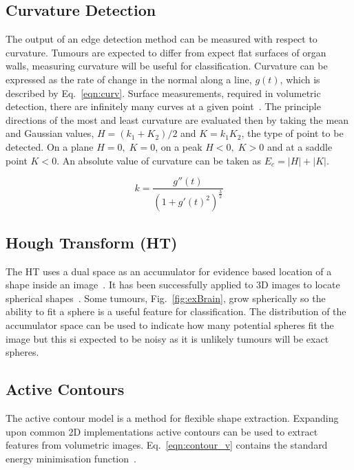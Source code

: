 \documentclass[journal]{IEEEtran}
\begin{document}
\subsection{Curvature Detection}
\label{sec:curvature_detection}
The output of an edge detection method can be measured with respect to curvature.
Tumours are expected to differ from expect flat surfaces of organ walls, measuring curvature will be useful for classification.
Curvature can be expressed as the rate of change in the normal along a line, $g(t)$, which is described by Eq.~\ref{eqn:curv}.
Surface measurements, required in volumetric detection, there are infinitely many curves at a given point~\cite{lohmann1998volumetric}.
The principle directions of the most and least curvature are evaluated then by taking the mean and Gaussian values, $H = (k_1 + K_2)/2$ and $K = k_1K_2$, the type of point to be detected.
On a plane $H = 0,\;K=0$, on a peak $H<0,\;K>0$ and at a saddle point $K<0$.
An absolute value of curvature can be taken as $E_c=|H|+|K|$.

\begin{equation}
	k = \frac{g''(t)}{(1 + g'(t)^2)^{\frac{3}{2}}}
	\label{eqn:curv}
\end{equation}


\subsection{Hough Transform (HT)}

The HT uses a dual space as an accumulator for evidence based location of a shape inside an image~\cite{nixon02feature}.
It has been successfully applied to 3D images to locate spherical shapes~\cite{abuzaina13hough}.
Some tumours, Fig.~\ref{fig:exBrain}, grow spherically so the ability to fit a sphere is a useful feature for classification.
The distribution of the accumulator space can be used to indicate how many potential spheres fit the image but this si expected to be noisy as it is unlikely tumours will be exact spheres.





\subsection{Active Contours}

The active contour model is a method for flexible shape extraction.
Expanding upon common 2D implementations active contours can be used to extract features from volumetric images.
Eq.~\eqref{eqn:contour_v} contains the standard energy minimisation function~\cite{nixon02feature,skalski13automatic}. 
\end{document}
